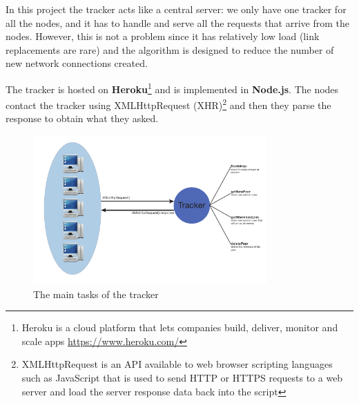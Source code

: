 In this project the tracker acts like a central server: we only have one tracker for all the nodes, and it has to handle and serve all the requests that arrive from the nodes. However, this is not a problem since it has relatively low load (link replacements are rare) and the algorithm is designed to reduce the number of new network connections created. 

The tracker is hosted on \textbf{Heroku}\footnote{Heroku is a cloud platform that lets companies build, deliver, monitor and scale apps \url{https://www.heroku.com/}} and is implemented in \textbf{Node.js}. The nodes contact the tracker using \textsf{XMLHttpRequest} (XHR)\footnote{XMLHttpRequest is an API available to web browser scripting languages such as JavaScript that is used to send HTTP or HTTPS requests to a web server and load the server response data back into the script} and then they parse the response to obtain what they asked.

\begin{figure}[ht]
  \centering
  \includegraphics[keepaspectratio=true, width=0.8\textwidth]{images/tracker}\caption{The main tasks of the tracker}
  \label{fig:tracker}
\end{figure}

